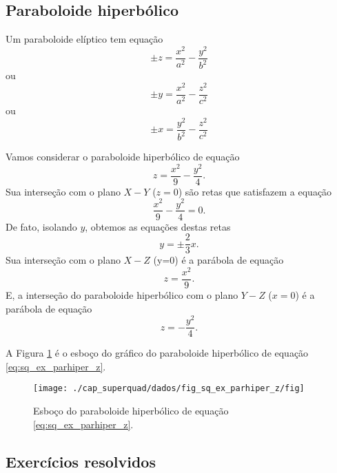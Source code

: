 \subsection{Paraboloide hiperbólico}

Um paraboloide elíptico tem equação
\begin{equation}
  \pm z = \frac{x^2}{a^2} - \frac{y^2}{b^2}
\end{equation}
ou
\begin{equation}
  \pm y = \frac{x^2}{a^2} - \frac{z^2}{c^2}
\end{equation}
ou
\begin{equation}
  \pm x = \frac{y^2}{b^2} - \frac{z^2}{c^2}
\end{equation}

\begin{ex}
  Vamos considerar o paraboloide hiperbólico de equação
  \begin{equation}\label{eq:sq_ex_parhiper_z}
    z=\frac{x^2}{9}-\frac{y^2}{4}.
  \end{equation}
  Sua interseção com o plano $X-Y$ ($z=0$) são retas que satisfazem a equação
  \begin{equation}
    \frac{x^2}{9}-\frac{y^2}{4}=0.
  \end{equation}
  De fato, isolando $y$, obtemos as equações destas retas
  \begin{equation}
    y = \pm \frac{2}{3}x.
  \end{equation}
  Sua interseção com o plano $X-Z$ (y=0) é a parábola de equação
  \begin{equation}
    z=\frac{x^2}{9}.
  \end{equation}
  E, a interseção do paraboloide hiperbólico com o plano $Y-Z$ ($x=0$) é a parábola de equação
  \begin{equation}
    z=-\frac{y^2}{4}.
  \end{equation}
  
  A Figura \ref{fig:sq_ex_parhiper_z} é o esboço do gráfico do paraboloide hiperbólico de equação \eqref{eq:sq_ex_parhiper_z}.

    \begin{figure}[H]
    \centering
    \texttt{[image: ./cap\_superquad/dados/fig\_sq\_ex\_parhiper\_z/fig]}
    \caption{Esboço do paraboloide hiperbólico de equação \eqref{eq:sq_ex_parhiper_z}.}
    \label{fig:sq_ex_parhiper_z}
  \end{figure}
\end{ex}

\subsection*{Exercícios resolvidos}

